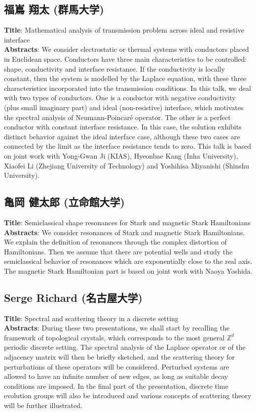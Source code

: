 \documentclass[a4paper,11pt]{article}
\numberwithin{equation}{section}
\begin{document}
\subsection*{\textbf{福嶌 翔太}  (群馬大学)}
\textbf{Title}: Mathematical analysis of transmission problem across ideal and resistive interface\\
\textbf{Abstracts}: We consider electrostatic or thermal systems with conductors placed in Euclidean space. Conductors have three main characteristics to be controlled: shape, conductivity and interface resistance. If the conductivity is locally constant, then the system is modelled by the Laplace equation, with these three characteristics incorporated into the transmission conditions. In this talk, we deal with two types of conductors. One is a conductor with negative conductivity (plus small imaginary part) and ideal (non-resistive) interface, which motivates the spectral analysis of Neumann-Poincaré operator. The other is a perfect conductor with constant interface resistance. In this case, the solution exhibits distinct behavior against the ideal interface case, although these two cases are connected by the limit as the interface resistance tends to zero. This talk is based on joint work with Yong-Gwan Ji (KIAS), Hyeonbae Kang (Inha University), Xiaofei Li (Zhejiang University of Technology) and Yoshihisa Miyanishi (Shinshu University). 

\subsection*{\textbf{亀岡 健太郎}  (立命館大学)}
\textbf{Title}: Semiclassical shape resonances for Stark and magnetic Stark Hamiltonians\\
\textbf{Abstracts}: We consider resonances of Stark and magnetic Stark Hamiltonians. We explain the definition of resonances through the complex distortion of  Hamiltonians. Then we assume that there are potential wells and study the semiclassical behavior of resonances which are exponentially close to the real axis. The magnetic Stark Hamiltonian part is based on joint work with Naoya Yoshida.  


\subsection*{\textbf{Serge Richard}  (名古屋大学)}
\textbf{Title}: Spectral and scattering theory in a discrete setting\\
\textbf{Abstracts}: During these two presentations, we shall start by recalling the
framework of topological crystals, which corresponds to the most general
$\mathbb{Z}^d$ periodic discrete setting. The spectral analysis of the Laplace
operator or of the adjacency matrix will then be briefly sketched, and
the scattering theory for perturbations of these operators will be
considered. Perturbed systems are allowed to have an infinite number of
new edges, as long as suitable decay conditions are imposed. In the
final part of the presentation, discrete time evolution groups will also
be introduced and various concepts of scattering theory will be further
illustrated. 
\end{document}
